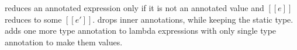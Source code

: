 
reduces an annotated expression only if it is not an annotated value and $[[e]]$
reduces to some $[[e']]$.  drops inner
annotations, while keeping the static type.
 adds one more type annotation to
lambda expressions with only single type annotation to make them values.

\begin{comment}
\Rref{step-beta} deals with a special case, that occurs when the
argument of a function is a non-annotatted lambda expression.
With bi-directional type-checking an expression such as:
($[[\f.f 1:(Int -> Int -> Int) : (Int -> Int -> Int)]]$)($[[\x.x]]$)
\bruno{example here.} \baber{Done.}
is well-typed, since bi-directional type-checking propagates
type information to the arguments. Thus, the dynamic semantics
needs to deal with such programs.
We emphasize the fact that $[[\x.e]]$ is not a value in \cal.
The rule follows the same approach as
\rref{step-beta} except that both of the input types are kept with
$[[\x.e]]$ during substitution i.e $[[\x.e:A2:A1]]$. \Rref{step-ann}
reduces an annotated expression only if it is not a value and $[[e]]$
reduces to some $[[e']]$. \Rref{step-rmann} drops inner
annotations. \Rref{step-lamann} adds one more type annotation with
lambda expressions having single type annotation to make them values.
\end{comment}

